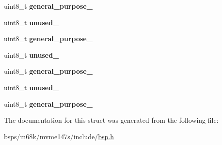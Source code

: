 \begin{DoxyCompactItemize}
\item 
\mbox{\label{structvme__gcsr__map_a9f5b2433bb1cafb67d964cad45937edd}} 
uint8\+\_\+t {\bfseries general\+\_\+purpose\+\_}
\item 
\mbox{\label{structvme__gcsr__map_a67b983bcc10fd01c1b8b46c2661cfdef}} 
uint8\+\_\+t {\bfseries unused\+\_}
\item 
\mbox{\label{structvme__gcsr__map_a5bd8028567f48cb97b3ca2218e8d6ca7}} 
uint8\+\_\+t {\bfseries general\+\_\+purpose\+\_}
\item 
\mbox{\label{structvme__gcsr__map_a2f9849f57b8a7cc21d556b81d77150af}} 
uint8\+\_\+t {\bfseries unused\+\_}
\item 
\mbox{\label{structvme__gcsr__map_ae4edd4dabf9f50eb34fda95abab747e5}} 
uint8\+\_\+t {\bfseries general\+\_\+purpose\+\_}
\item 
\mbox{\label{structvme__gcsr__map_ad575d55cc94543a61de1f6e7207e7e33}} 
uint8\+\_\+t {\bfseries unused\+\_}
\item 
\mbox{\label{structvme__gcsr__map_a5d14fc7580be1327bc718b8292cb0396}} 
uint8\+\_\+t {\bfseries general\+\_\+purpose\+\_}
\end{DoxyCompactItemize}


The documentation for this struct was generated from the following file\+:\begin{DoxyCompactItemize}
\item 
bsps/m68k/mvme147s/include/\mbox{\hyperlink{bsps_2m68k_2mvme147s_2include_2bsp_8h}{bsp.\+h}}\end{DoxyCompactItemize}
